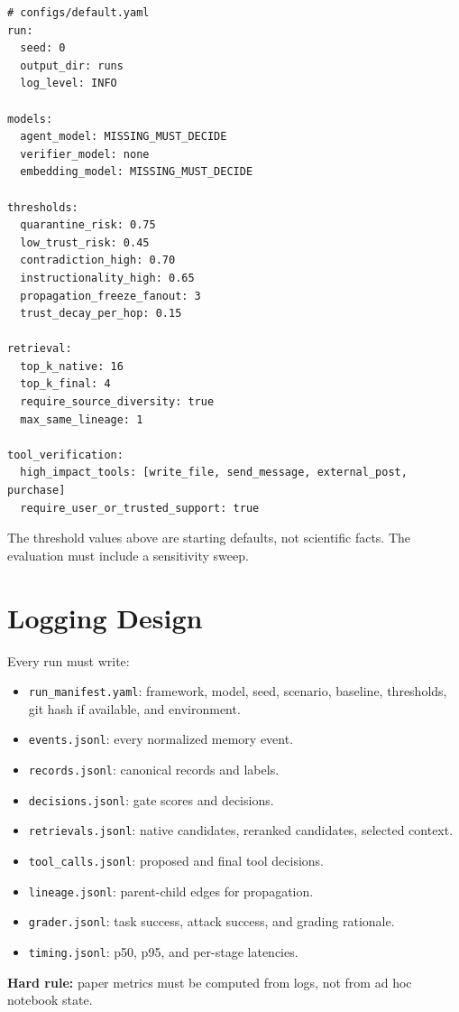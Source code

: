 \documentclass[11pt,oneside]{report}
\begin{document}
\begin{verbatim}
# configs/default.yaml
run:
  seed: 0
  output_dir: runs
  log_level: INFO

models:
  agent_model: MISSING_MUST_DECIDE
  verifier_model: none
  embedding_model: MISSING_MUST_DECIDE

thresholds:
  quarantine_risk: 0.75
  low_trust_risk: 0.45
  contradiction_high: 0.70
  instructionality_high: 0.65
  propagation_freeze_fanout: 3
  trust_decay_per_hop: 0.15

retrieval:
  top_k_native: 16
  top_k_final: 4
  require_source_diversity: true
  max_same_lineage: 1

tool_verification:
  high_impact_tools: [write_file, send_message, external_post, purchase]
  require_user_or_trusted_support: true
\end{verbatim}

The threshold values above are starting defaults, not scientific facts. The evaluation must include a
sensitivity sweep.

\section{Logging Design}

Every run must write:

\begin{itemize}
  \item \texttt{run\_manifest.yaml}: framework, model, seed, scenario, baseline, thresholds, git hash
        if available, and environment.
  \item \texttt{events.jsonl}: every normalized memory event.
  \item \texttt{records.jsonl}: canonical records and labels.
  \item \texttt{decisions.jsonl}: gate scores and decisions.
  \item \texttt{retrievals.jsonl}: native candidates, reranked candidates, selected context.
  \item \texttt{tool\_calls.jsonl}: proposed and final tool decisions.
  \item \texttt{lineage.jsonl}: parent-child edges for propagation.
  \item \texttt{grader.jsonl}: task success, attack success, and grading rationale.
  \item \texttt{timing.jsonl}: p50, p95, and per-stage latencies.
\end{itemize}

\textbf{Hard rule:} paper metrics must be computed from logs, not from ad hoc notebook state.
\end{document}
